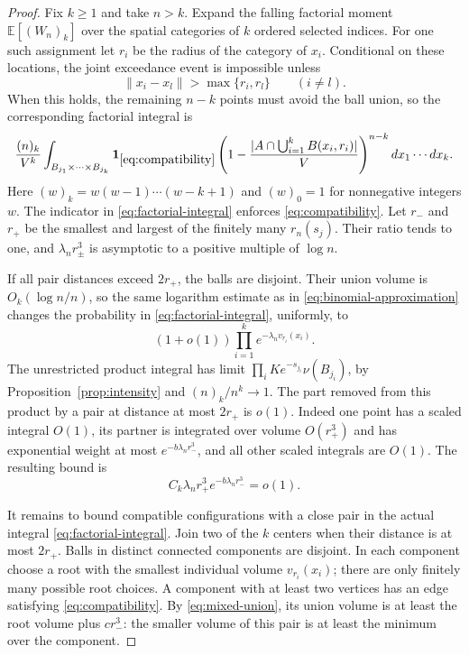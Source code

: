 \documentclass[11pt]{article}
\newcommand{\EE}{\mathbb E}
\newcommand{\norm}[1]{\lVert #1\rVert}
\begin{document}
\begin{proof}
Fix $k\geq1$ and take $n>k$. Expand the falling factorial moment $\EE[(W_n)_k]$ over
the spatial categories of $k$ ordered selected indices. For one such
assignment let $r_i$ be the radius of the category of $x_i$. Conditional
on these locations, the joint exceedance event is impossible unless
\begin{equation}\label{eq:compatibility}
 \norm{x_i-x_l}>\max\{r_i,r_l\}\qquad(i\ne l).
\end{equation}
When this holds, the remaining $n-k$ points must avoid the ball union,
so the corresponding factorial integral is
\begin{equation}\label{eq:factorial-integral}
 \frac{(n)_k}{V^k}\int_{B_{j_1}\times\cdots\times B_{j_k}}
 \mathbf1_{\eqref{eq:compatibility}}
 \left(1-\frac{|A\cap\bigcup_{i=1}^kB(x_i,r_i)|}{V}\right)^{n-k}
 dx_1\cdots dx_k.
\end{equation}
Here $(w)_k=w(w-1)\cdots(w-k+1)$ and $(w)_0=1$ for nonnegative integers $w$. The indicator in \eqref{eq:factorial-integral} enforces \eqref{eq:compatibility}. Let $r_-$ and $r_+$ be the smallest
and largest of the finitely many $r_n(s_j)$. Their ratio tends to one,
and $\lambda_nr_\pm^3$ is asymptotic to a positive multiple of $\log n$.

If all pair distances exceed $2r_+$, the balls are disjoint. Their union
volume is $O_k(\log n/n)$, so the same logarithm estimate as in
\eqref{eq:binomial-approximation} changes the probability in
\eqref{eq:factorial-integral}, uniformly, to
\[
 (1+o(1))\prod_{i=1}^k e^{-\lambda_nv_{r_i}(x_i)}.
\]
The unrestricted product integral has limit
$\prod_i Ke^{-s_{j_i}}\nu(B_{j_i})$, by
Proposition~\ref{prop:intensity} and $(n)_k/n^k\to1$.
The part removed from this product by a pair at distance at most $2r_+$
is $o(1)$. Indeed one point has a scaled integral $O(1)$, its partner
is integrated over volume $O(r_+^3)$ and has exponential weight at most
$e^{-b\lambda_nr_-^3}$, and all other scaled integrals are $O(1)$.
The resulting bound is
\begin{equation}\label{eq:product-near}
 C_k\lambda_nr_+^3e^{-b\lambda_nr_-^3}=o(1).
\end{equation}

It remains to bound compatible configurations with a close pair in the
actual integral \eqref{eq:factorial-integral}. Join two of the $k$ centers
when their distance is at most $2r_+$. Balls in distinct connected
components are disjoint. In each component choose a root with the smallest
individual volume $v_{r_i}(x_i)$; there are only finitely many possible root
choices. A component with at least two vertices has an edge satisfying
\eqref{eq:compatibility}. By \eqref{eq:mixed-union}, its union volume is
at least the root volume plus $c r_-^3$: the smaller volume of this pair
is at least the minimum over the component.


\end{proof}
\end{document}
